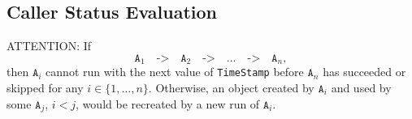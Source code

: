 \documentclass[a4paper,12pt,english,oneside]{book}
\begin{document}
\subsection{Caller Status Evaluation}


ATTENTION: If
\begin{displaymath}
\texttt{A}_1\quad\texttt{->}\quad\texttt{A}_2\quad\texttt{->}\quad\ldots\quad\texttt{->}\quad\texttt{A}_n,
\end{displaymath}
then $\texttt{A}_i$ cannot run with the next value of \verb|TimeStamp| before $\texttt{A}_n$ has succeeded or skipped for any $i\in\{1,\ldots,n\}$. Otherwise, an object created by $\texttt{A}_i$ and used by some $\texttt{A}_j$, $i<j$, would be recreated by a new run of $\texttt{A}_i$.
\end{document}
